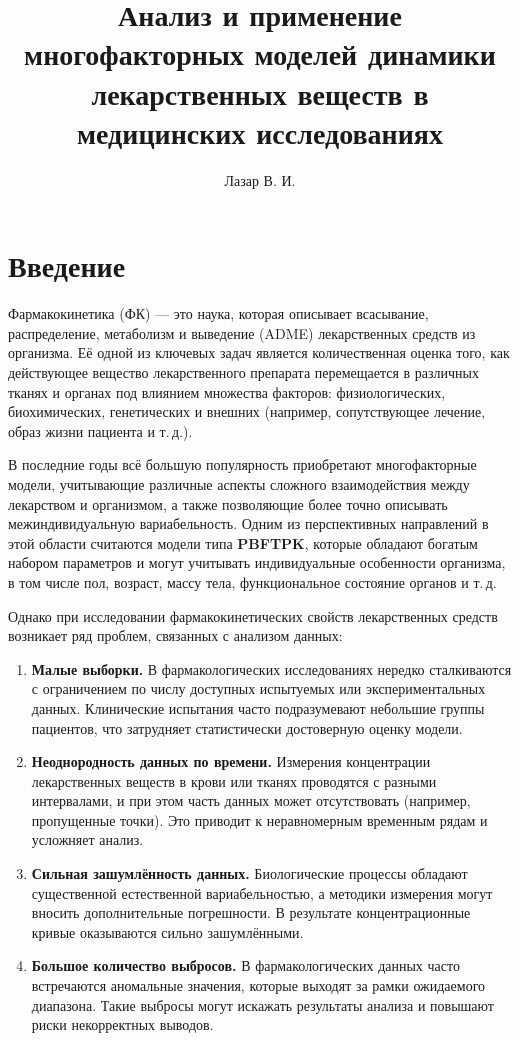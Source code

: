 \documentclass[12pt]{article}
\author{Лазар В. И.}
\title{Анализ и применение многофакторных моделей динамики лекарственных веществ в медицинских исследованиях}
\begin{document}
\maketitle

\tableofcontents

\newpage

\section{Введение}

Фармакокинетика (ФК) — это наука, которая описывает всасывание, распределение, метаболизм и выведение (ADME) лекарственных средств из организма. Её одной из ключевых задач является количественная оценка того, как действующее вещество лекарственного препарата перемещается в различных тканях и органах под влиянием множества факторов: физиологических, биохимических, генетических и внешних (например, сопутствующее лечение, образ жизни пациента и т.\,д.).

В последние годы всё большую популярность приобретают многофакторные модели, учитывающие различные аспекты сложного взаимодействия между лекарством и организмом, а также позволяющие более точно описывать межиндивидуальную вариабельность. Одним из перспективных направлений в этой области считаются модели типа \textbf{PBFTPK}, которые обладают богатым набором параметров и могут учитывать индивидуальные особенности организма, в том числе пол, возраст, массу тела, функциональное состояние органов и т.\,д.

Однако при исследовании фармакокинетических свойств лекарственных средств возникает ряд проблем, связанных с анализом данных:

\begin{enumerate}
	\item \textbf{Малые выборки.} В фармакологических исследованиях нередко сталкиваются с ограничением по числу доступных испытуемых или экспериментальных данных. Клинические испытания часто подразумевают небольшие группы пациентов, что затрудняет статистически достоверную оценку модели.

	\item \textbf{Неоднородность данных по времени.} Измерения концентрации лекарственных веществ в крови или тканях проводятся с разными интервалами, и при этом часть данных может отсутствовать (например, пропущенные точки). Это приводит к неравномерным временным рядам и усложняет анализ.

	\item \textbf{Сильная зашумлённость данных.} Биологические процессы обладают существенной естественной вариабельностью, а методики измерения могут вносить дополнительные погрешности. В результате концентрационные кривые оказываются сильно зашумлёнными.

	\item \textbf{Большое количество выбросов.} В фармакологических данных часто встречаются аномальные значения, которые выходят за рамки ожидаемого диапазона. Такие выбросы могут искажать результаты анализа и повышают риски некорректных выводов.

\end{enumerate}
\end{document}
